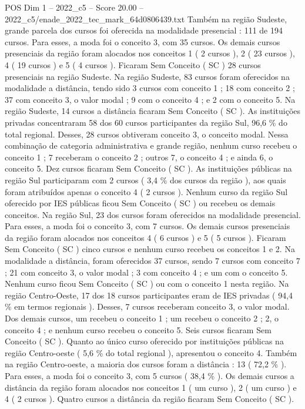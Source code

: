 \begin{textsample}{POS Dim 1 – 2022\_c5 – Score 20.00 – 2022\_c5/enade\_2022\_tec\_mark\_64d0806439.txt}
Também na região Sudeste, grande parcela dos cursos foi oferecida na modalidade presencial : 111 de 194 cursos.
Para esses, a moda foi o conceito 3, com 35 cursos.
Os demais cursos presenciais da região foram alocados nos conceitos 1 ( 2 cursos ), 2 ( 23 cursos ), 4 ( 19 cursos ) e 5 ( 4 cursos ).
Ficaram Sem Conceito ( SC ) 28 cursos presenciais na região Sudeste.
Na região Sudeste, 83 cursos foram oferecidos na modalidade a distância, tendo sido 3 cursos com conceito 1 ; 18 com conceito 2 ; 37 com conceito 3, o valor modal ; 9 com o conceito 4 ; e 2 com o conceito 5.
Na região Sudeste, 14 cursos a distância ficaram Sem Conceito ( SC ).
As instituições privadas concentraram 58 dos 60 cursos participantes da região Sul, 96,6 \% do total regional.
Desses, 28 cursos obtiveram conceito 3, o conceito modal.
Nessa combinação de categoria administrativa e grande região, nenhum curso recebeu o conceito 1 ; 7 receberam o conceito 2 ; outros 7, o conceito 4 ; e ainda 6, o conceito 5.
Dez cursos ficaram Sem Conceito ( SC ).
As instituições públicas na região Sul participaram com 2 cursos ( 3,4 \% dos cursos da região ), aos quais foram atribuídos apenas o conceito 4 ( 2 cursos ).
Nenhum curso da região Sul oferecido por IES públicas ficou Sem Conceito ( SC ) ou recebeu os demais conceitos.
Na região Sul, 23 dos cursos foram oferecidos na modalidade presencial.
Para esses, a moda foi o conceito 3, com 7 cursos.
Os demais cursos presenciais da região foram alocados nos conceitos 4 ( 6 cursos ) e 5 ( 5 cursos ).
Ficaram Sem Conceito ( SC ) cinco cursos e nenhum curso recebeu os conceitos 1 e 2.
Na modalidade a distância, foram oferecidos 37 cursos, sendo 7 cursos com conceito 7 ; 21 com conceito 3, o valor modal ; 3 com conceito 4 ; e um com o conceito 5.
Nenhum curso ficou Sem Conceito ( SC ) ou com o conceito 1 nesta região.
Na região Centro-Oeste, 17 dos 18 cursos participantes eram de IES privadas ( 94,4 \% em termos regionais ).
Desses, 7 cursos receberam conceito 3, o valor modal.
Dos demais cursos, um recebeu o conceito 1 ; um recebeu o conceito 2 ; 2, o conceito 4 ; e nenhum curso recebeu o conceito 5.
Seis cursos ficaram Sem Conceito ( SC ).
Quanto ao único curso oferecido por instituições públicas na região Centro-oeste ( 5,6 \% do total regional ), apresentou o conceito 4.
Também na região Centro-oeste, a maioria dos cursos foram a distância : 13 ( 72,2 \% ).
Para esses, a moda foi o conceito 3, com 5 cursos ( 38,4 \% ).
Os demais cursos a distância da região foram alocados nos conceitos 1 ( um curso ), 2 ( um curso ) e 4 ( 2 cursos ).
Quatro cursos a distância da região ficaram Sem Conceito ( SC ).

\end{textsample}
